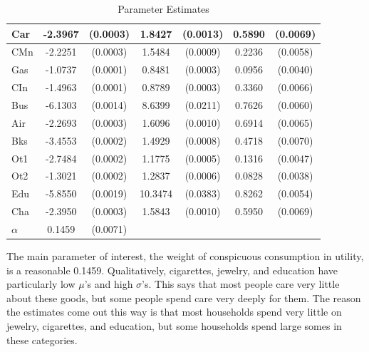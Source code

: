 \documentclass{article}
\begin{document}
\begin{table}
\begin{center}
\begin{tabular}{|l|c c |c c |c c|}
			\hline
			Car & -2.3967 &  (0.0003) &  1.8427 & (0.0013) &   0.5890 & (0.0069)\\ 
			\hline
			CMn & -2.2251 &  (0.0003) &  1.5484 & (0.0009) &   0.2236 & (0.0058)\\ 
			\hline
			Gas & -1.0737 &  (0.0001) &  0.8481 & (0.0003) &   0.0956 & (0.0040)\\ 
			\hline
			CIn & -1.4963 &  (0.0001) &  0.8789 & (0.0003) &   0.3360 & (0.0066)\\ 
			\hline
			Bus & -6.1303 &  (0.0014) &  8.6399 & (0.0211) &   0.7626 & (0.0060)\\ 
			\hline
			Air & -2.2693 &  (0.0003) &  1.6096 & (0.0010) &   0.6914 & (0.0065)\\ 
			\hline
			Bks & -3.4553 &  (0.0002) &  1.4929 & (0.0008) &   0.4718 & (0.0070)\\ 
			\hline
			Ot1 & -2.7484 &  (0.0002) &  1.1775 & (0.0005) &   0.1316 & (0.0047)\\ 
			\hline
			Ot2 & -1.3021 &  (0.0002) &  1.2837 & (0.0006) &   0.0828 & (0.0038)\\ 
			\hline
			Edu & -5.8550 &  (0.0019) & 10.3474 & (0.0383) &   0.8262 & (0.0054)\\ 
			\hline
			Cha & -2.3950 &  (0.0003) &  1.5843 & (0.0010) &   0.5950 & (0.0069)\\ 
			\hline
		        \hline	
			$\alpha$ & 0.1459 & (0.0071) & & & & \\
			\hline
			\hline
		\end{tabular}
	\end{center}
	\caption{Parameter Estimates}
	\label{tab:parest}
\end{table}
The main parameter of interest, the weight of conspicuous consumption in utility, is a reasonable 0.1459.  
Qualitatively, cigarettes, jewelry, and education have particularly low $\mu$'s and high $\sigma$'s. 
This says that most people care very little about these goods, but some people spend care very deeply for them.
The reason the estimates come out this way is that most households spend very little on jewelry, cigarettes, and education, but some households spend large somes in these categories. 
\end{document}
